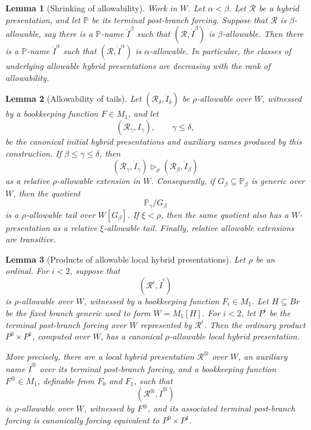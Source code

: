 \documentclass[10pt,a4paper]{amsart}
\newtheorem{lemma}{Lemma}
\begin{document}
\begin{lemma}[Shrinking of allowability]
\label{lem:shrinking-allowability-local}
Work in \(W\).  Let \(\alpha<\beta\).  Let \(\mathcal R\) be a hybrid presentation,
and let \(\mathbb P\) be its terminal post-branch forcing.  Suppose that
\(\mathcal R\) is \(\beta\)-allowable, say there is a
\(\mathbb P\)-name \(\dot I^\beta\) such that \((\mathcal R,\dot I^\beta)\) is
\(\beta\)-allowable.  Then there is a \(\mathbb P\)-name \(\dot I^\alpha\) such
that \((\mathcal R,\dot I^\alpha)\) is \(\alpha\)-allowable.  In particular, the
classes of underlying allowable hybrid presentations are decreasing with the
rank of allowability.
\end{lemma}

\begin{lemma}[Allowability of tails]\label{lem:tail-allowability-local}
Let \((\mathcal R_\delta,\dot I_\delta)\) be \(\rho\)-allowable over \(W\),
witnessed by a bookkeeping function \(F\in M_1\), and let
\[
   (\mathcal R_\gamma,\dot I_\gamma),\qquad \gamma\leq\delta,
\]
be the canonical initial hybrid presentations and auxiliary names produced by
this construction.  If \(\beta\leq\gamma\leq\delta\), then
\[
   (\mathcal R_\gamma,\dot I_\gamma)
   \triangleright_\rho
   (\mathcal R_\beta,\dot I_\beta)
\]
as a relative \(\rho\)-allowable extension in \(W\).  Consequently, if
\(G_\beta\subseteq\mathbb P_\beta\) is generic over \(W\), then the quotient
\[
   \mathbb P_\gamma/G_\beta
\]
is a \(\rho\)-allowable tail over \(W[G_\beta]\).  If \(\xi<\rho\), then the
same quotient also has a \(W\)-presentation as a relative \(\xi\)-allowable
tail.  Finally, relative allowable extensions are transitive.
\end{lemma}

\begin{lemma}[Products of allowable local hybrid presentations]
\label{lem:rho-allowable-products-local}
Let \(\rho\) be an ordinal.  For \(i<2\), suppose that
\[
   (\mathcal R^i,\dot I^i)
\]
is \(\rho\)-allowable over \(W\), witnessed by a bookkeeping function
\(F_i\in M_1\).  Let \(H\subseteq Br\) be the fixed branch generic used to form
\(W=M_1[H]\).  For \(i<2\), let \(P^i\) be the terminal post-branch forcing over
\(W\) represented by \(\mathcal R^i\).  Then the ordinary product
\(P^0\times P^1\), computed over \(W\), has a canonical \(\rho\)-allowable local
hybrid presentation.

More precisely, there are a local hybrid presentation \(\mathcal R^\otimes\) over
\(W\), an auxiliary name \(\dot I^\otimes\) over its terminal post-branch forcing,
and a bookkeeping function \(F^\otimes\in M_1\), definable from \(F_0\) and
\(F_1\), such that
\[
   (\mathcal R^\otimes,\dot I^\otimes)
\]
is \(\rho\)-allowable over \(W\), witnessed by \(F^\otimes\), and its associated
terminal post-branch forcing is canonically forcing equivalent to
\(P^0\times P^1\).
\end{lemma}
\end{document}
